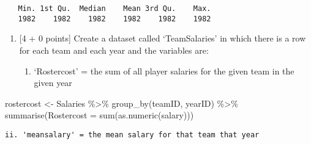 \documentclass[
]{article}
\newenvironment{Shaded}{\begin{snugshade}}{\end{snugshade}}
\newcommand{\AttributeTok}[1]{\textcolor[rgb]{0.77,0.63,0.00}{#1}}
\newcommand{\CommentTok}[1]{\textcolor[rgb]{0.56,0.35,0.01}{\textit{#1}}}
\newcommand{\FunctionTok}[1]{\textcolor[rgb]{0.00,0.00,0.00}{#1}}
\newcommand{\NormalTok}[1]{#1}
\newcommand{\OtherTok}[1]{\textcolor[rgb]{0.56,0.35,0.01}{#1}}
\newcommand{\SpecialCharTok}[1]{\textcolor[rgb]{0.00,0.00,0.00}{#1}}
\newcommand{\StringTok}[1]{\textcolor[rgb]{0.31,0.60,0.02}{#1}}
\providecommand{\tightlist}{%
  \setlength{\itemsep}{0pt}\setlength{\parskip}{0pt}}
\begin{document}
\begin{Shaded}
\end{Shaded}

\begin{verbatim}
   Min. 1st Qu.  Median    Mean 3rd Qu.    Max. 
   1982    1982    1982    1982    1982    1982 
\end{verbatim}

\begin{enumerate}
\def\labelenumi{\alph{enumi}.}
\setcounter{enumi}{3}
\item
  {[}4 + 0 points{]} Create a dataset called `TeamSalaries' in which
  there is a row for each team and each year and the variables are:

  \begin{enumerate}
  \def\labelenumii{\roman{enumii}.}
  \tightlist
  \item
    `Rostercost' = the sum of all player salaries for the given team in
    the given year
  \end{enumerate}
\end{enumerate}

\begin{Shaded}
\begin{Highlighting}[]
\NormalTok{rostercost }\OtherTok{\textless{}{-}}\NormalTok{ Salaries }\SpecialCharTok{\%\textgreater{}\%}
  \FunctionTok{group\_by}\NormalTok{(teamID, yearID) }\SpecialCharTok{\%\textgreater{}\%}
  \FunctionTok{summarise}\NormalTok{(}\AttributeTok{Rostercost =} \FunctionTok{sum}\NormalTok{(}\FunctionTok{as.numeric}\NormalTok{(salary)))}
\end{Highlighting}
\end{Shaded}

\begin{verbatim}
ii. 'meansalary' = the mean salary for that team that year
\end{verbatim}
\end{document}
